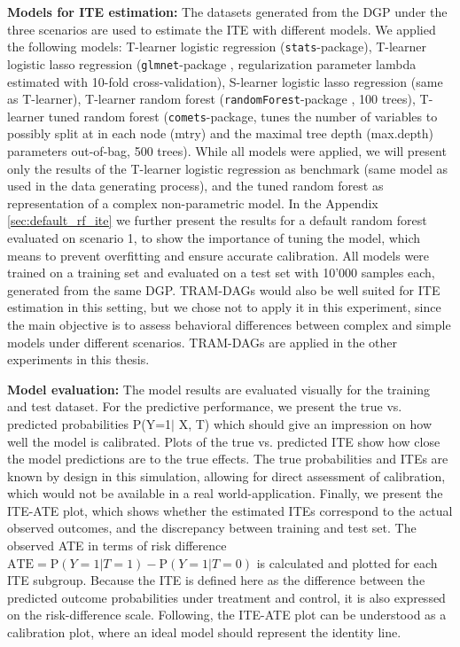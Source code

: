 \textbf{Models for ITE estimation: } The datasets generated from the DGP under the three scenarios are used to estimate the ITE with different models. We applied the following models: T-learner logistic regression (\texttt{stats}-package), T-learner logistic lasso regression (\texttt{glmnet}-package \citep{friedman2010}, regularization parameter lambda estimated with 10-fold cross-validation), S-learner logistic lasso regression (same as T-learner), T-learner random forest (\texttt{randomForest}-package \citep{breiman2001}, 100 trees), T-learner tuned random forest (\texttt{comets}-package, tunes the number of variables to possibly split at in each node (mtry) and the maximal tree depth (max.depth) parameters out-of-bag, 500 trees). While all models were applied, we will present only the results of the T-learner logistic regression as benchmark (same model as used in the data generating process), and the tuned random forest as representation of a complex non-parametric model. In the Appendix \ref{sec:default_rf_ite} we further present the results for a default random forest evaluated on scenario 1, to show the importance of tuning the model, which means to prevent overfitting and ensure accurate calibration. All models were trained on a training set and evaluated on a test set with 10'000 samples each, generated from the same DGP. TRAM-DAGs would also be well suited for ITE estimation in this setting, but we chose not to apply it in this experiment, since the main objective is to assess behavioral differences between complex and simple models under different scenarios. TRAM-DAGs are applied in the other experiments in this thesis. 


\textbf{Model evaluation: } The model results are evaluated visually for the training and test dataset. For the predictive performance, we present the true vs. predicted probabilities P(Y=1$\mid$ X, T) which should give an impression on how well the model is calibrated. Plots of the true vs. predicted ITE show how close the model predictions are to the true effects. The true probabilities and ITEs are known by design in this simulation, allowing for direct assessment of calibration, which would not be available in a real world-application. Finally, we present the ITE-ATE plot, which shows whether the estimated ITEs correspond to the actual observed outcomes, and the discrepancy between training and test set. The observed ATE in terms of risk difference $\text{ATE} = \text{P}(Y=1|T=1) - \text{P}(Y=1|T=0)$ is calculated and plotted for each ITE subgroup. Because the ITE is defined here as the difference between the predicted outcome probabilities under treatment and control, it is also expressed on the risk-difference scale. Following, the ITE-ATE plot can be understood as a calibration plot, where an ideal model should represent the identity line. 

